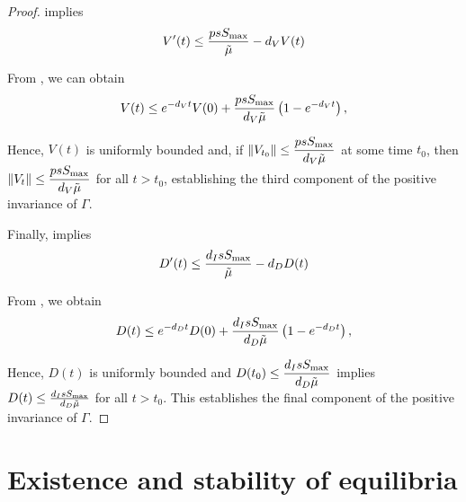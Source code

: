\documentclass{CMHPhD-SIVD}
\begin{document}
\begin{proof}
 implies
\begin{eqnarray}\label{39}
V'(t)\leq \frac{ps S_{\text{max}}}{\tilde{\mu}}-d_V V(t)
\end{eqnarray}

From , we can obtain
\begin{align*}
V(t)\leq e^{-d_V t}V(0)+\frac{p s S_{\text{max}}}{d_V\tilde{\mu}}\left(1-e^{-d_V t}\right),
\end{align*}

Hence, $V(t)$ is uniformly bounded and, if $\|V_{t_0}\| \leq \dfrac{ p s S_{\text{max}}}{d_V\tilde{\mu}}$ at some time ${t_0}$,  then $\|V_t\| \leq \dfrac{ p s S_{\text{max}}}{d_V\tilde{\mu}}$ for all $t>t_0$, establishing the third component of the positive invariance of $\Gamma$.



Finally,  implies
\begin{eqnarray}\label{40}
D'(t)\leq  \dfrac{d_I s S_{\text{max}}}{\tilde{\mu}}-d_D D(t)
\end{eqnarray}

From , we obtain
\begin{align*}
D(t)\leq e^{-d_D t}D(0)+\dfrac{d_I s S_{\text{max}}}{d_D\tilde{\mu}}\left(1-e^{-d_D t}\right),
\end{align*}

Hence, $D(t)$ is uniformly bounded and $D(t_0)\leq \dfrac{ d_I s S_{\text{max}}}{d_D\tilde{\mu}}$ implies $D(t)\leq \frac{d_I s S_{\text{max}}}{d_D\tilde{\mu}}$ for all $t>t_0$. This establishes the final component of the positive invariance of $\Gamma$.


\end{proof}

\section{Existence and stability of equilibria}
\end{document}
